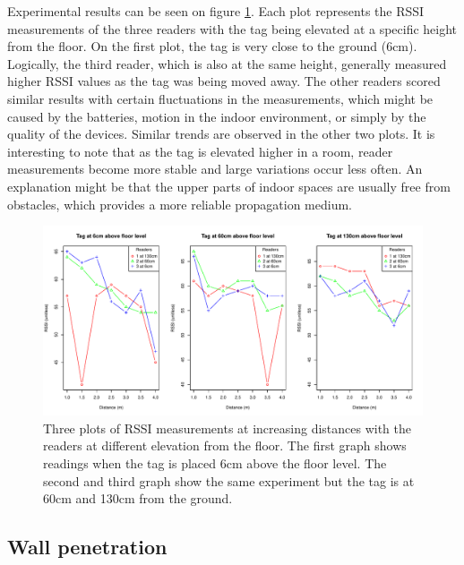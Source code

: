 Experimental results can be seen on figure \ref{fig:eler}. Each plot represents the RSSI measurements of the three readers with the tag being elevated at a specific height from the floor. On the first plot, the tag is very close to the ground (6cm). Logically, the third reader, which is also at the same height, generally measured higher RSSI values as the tag was being moved away. The other readers scored similar results with certain fluctuations in the measurements, which might be caused by the batteries, motion in the indoor environment, or simply by the quality of the devices. Similar trends are observed in the other two plots. It is interesting to note that as the tag is elevated higher in a room, reader measurements become more stable and large variations occur less often. An explanation might be that the upper parts of indoor spaces are usually free from obstacles, which provides a more reliable propagation medium.
\begin{figure}[H]
	\begin{center}
		\includegraphics[width=1\textwidth]{figures/rssi_distance_4m}
		\caption{Three plots of RSSI measurements at increasing distances with the readers at different elevation from the floor. The first graph shows readings when the tag is placed 6cm above the floor level. The second and third graph show the same experiment but the tag is at 60cm and 130cm from the ground.}
		\label{fig:eler}
	\end{center}
\end{figure}


\subsection{Wall penetration}

